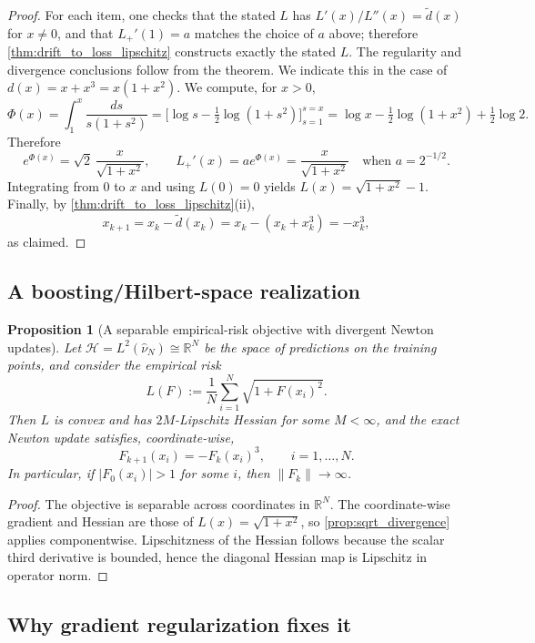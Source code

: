 \documentclass{article}
\theoremstyle{plain}
\newtheorem{proposition}[theorem]{Proposition}
\theoremstyle{definition}
\theoremstyle{remark}
\begin{document}
\begin{proof}
For each item, one checks that the stated $L$ has $L'(x)/L''(x)=\tilde d(x)$ for $x\neq 0$,
and that $L_+'(1)=a$ matches the choice of $a$ above; therefore \cref{thm:drift_to_loss_lipschitz}
constructs exactly the stated $L$. The regularity and divergence conclusions follow from the theorem. We indicate this in the case of $d(x)=x+x^3=x(1+x^2)$. We compute, for $x>0$,
\[
\Phi(x)=\int_1^x\frac{ds}{s(1+s^2)}
=\Big[\log s-\tfrac12\log(1+s^2)\Big]_{s=1}^{s=x}
=\log x-\tfrac12\log(1+x^2)+\tfrac12\log 2.
\]
Therefore
\[
e^{\Phi(x)}=\sqrt{2}\,\frac{x}{\sqrt{1+x^2}},
\qquad
L_+'(x)=a e^{\Phi(x)}=\frac{x}{\sqrt{1+x^2}}
\quad\text{when } a=2^{-1/2}.
\]
Integrating from $0$ to $x$ and using $L(0)=0$ yields $L(x)=\sqrt{1+x^2}-1$.
Finally, by \cref{thm:drift_to_loss_lipschitz}(ii),
\[
x_{k+1}=x_k-\tilde d(x_k)=x_k-(x_k+x_k^3)=-x_k^3,
\]
as claimed.
\end{proof}


\subsection{A boosting/Hilbert-space realization}

\begin{proposition}[A separable empirical-risk objective with divergent Newton updates]
\label{prop:boosting_realization}
Let $\mathcal{H}=L^2(\hat\nu_N)\cong \mathbb{R}^N$ be the space of predictions on the training points,
and consider the empirical risk
\[
  L(F) := \frac1N\sum_{i=1}^N \sqrt{1 + F(x_i)^2}.
\]
Then $L$ is convex and has $2M$-Lipschitz Hessian for some $M<\infty$, and the exact Newton update satisfies, coordinate-wise,
\[
  F_{k+1}(x_i) = -F_k(x_i)^3,\qquad i=1,\dots,N.
\]
In particular, if $|F_0(x_i)|>1$ for some $i$, then $\|F_k\|\to\infty$.
\end{proposition}

\begin{proof}
The objective is separable across coordinates in $\mathbb{R}^N$. The coordinate-wise gradient and
Hessian are those of $L(x)=\sqrt{1+x^2}$, so \cref{prop:sqrt_divergence} applies componentwise.
Lipschitzness of the Hessian follows because the scalar third derivative is bounded, hence the diagonal
Hessian map is Lipschitz in operator norm.
\end{proof}

\subsection{Why gradient regularization fixes it}
\end{document}
